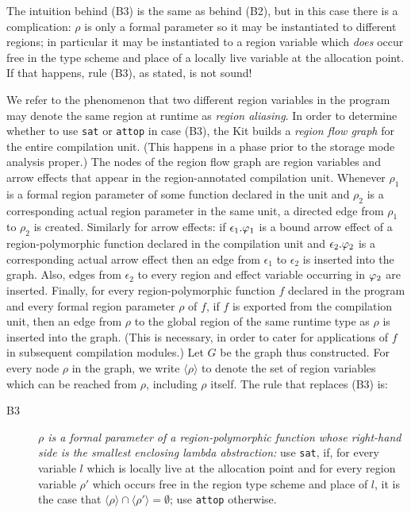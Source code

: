 \documentclass[12pt]{book}
\begin{document}
The intuition behind (B3) is the same as behind (B2), but
in this case there is a complication: 
$\rho$ is only a formal parameter so it may
be instantiated to different regions; 
in particular it may be instantiated to 
a region variable which {\em does} occur free in the type scheme and place of a
locally live variable at the allocation point. If that happens, 
rule (B3), as stated, is not sound!

We refer to the phenomenon that two different region variables in the
program may denote the same region at runtime as  {\em region aliasing}. In order to determine whether to
use {\tt sat} or {\tt attop} in case (B3), the Kit builds a
\label{region flow graph}{\em region flow
  graph} for the entire compilation unit. (This happens in a phase
prior to the storage mode analysis proper.)  The nodes of the region
flow graph are region variables and arrow effects that appear in the
region-annotated compilation unit.  Whenever $\rho_1$ is a formal
region parameter of some function declared in the unit and $\rho_2$ is
a corresponding actual region parameter in the same unit, a directed
edge from $\rho_1$ to $\rho_2$ is created. Similarly for arrow
effects: if $\epsilon_1.\varphi_1$ is a bound arrow effect of a
region-polymorphic function declared in the compilation unit and
$\epsilon_2.\varphi_2$ is a corresponding actual arrow effect then an
edge from $\epsilon_1$ to $\epsilon_2$ is inserted into the graph.
Also, edges from $\epsilon_2$ to every region and effect variable
occurring in $\varphi_2$ are inserted. Finally, for every
region-polymorphic function $f$ declared in the program and every
formal region parameter $\rho$ of $f$, if $f$ is exported from the
compilation unit, then an edge from $\rho$ to the global region of the
same runtime type as $\rho$ is inserted into the graph. (This is
necessary, in order to cater for applications of $f$ in subsequent
compilation modules.)  Let $G$ be the graph thus constructed. For
every node $\rho$ in the graph, we write $\langle\rho\rangle$ to
denote the set of region variables which can be reached from $\rho$,
including $\rho$ itself. The rule that replaces (B3)
is:
\begin{description}
\item[B3]{\it $\rho$ is a formal parameter of a region-polymorphic function
      whose right-hand side is the smallest enclosing lambda abstraction:}
      use {\tt sat}, if, for every variable $l$ which is locally live 
      at the allocation point and for every region variable $\rho'$
      which occurs free in the region type scheme and place of $l$, it
      is the case that $\langle\rho\rangle\cap\langle\rho'\rangle =\emptyset$;
      use {\tt attop} otherwise.
\end{description}
\medskip
\end{document}
